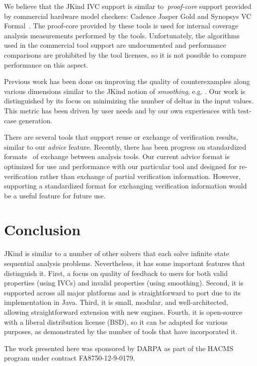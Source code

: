 \documentclass{llncs}
\newcommand{\jkind}{{\sc JKind}\xspace}
\newcommand{\lustre}{{\sc Lustre}\xspace}
\renewcommand{\paragraph}[1]{\vspace{5pt}\noindent {\bf #1}}
\begin{document}
We believe that the \jkind IVC support is similar to~\emph{proof-core}
support provided by commercial hardware model checkers: Cadence Jasper
Gold and Synopsys VC Formal~\cite{hanna2015formal, jasper_gold,
  Synopsys_VC_formal}.  The proof-core provided by these tools is used
for internal coverage analysis measurements performed by the tools.
Unfortunately, the algorithms used in the commercial tool support are
undocumented and performance comparisons are prohibited by the tool
licenses, so it is not possible to compare performance on this aspect.

Previous work has been done on improving the quality of
counterexamples along various dimensions similar to the \jkind notion
of {\em smoothing}, e.g. \cite{groce2005bmc, ravi2004tacas}. Our work
is distinguished by its focus on minimizing the number of deltas in
the input values. This metric has been driven by user needs and by our
own experiences with test-case generation.

There are several tools that support reuse or exchange of verification
results, similar to our {\em advice} feature.  Recently, there has
been progress on standardized formats~\cite{Beyer:2016} of exchange
between analysis tools.  Our current advice format is optimized for
use and performance with our particular tool and designed for
re-verification rather than exchange of partial verification
information.  However, supporting a standardized format for exchanging
verification information would be a useful feature for future use.



\section{Conclusion}
\jkind is similar to a number of other solvers that each solve
infinite state sequential analysis problems. Nevertheless, it has some
important features that distinguish it. First, a focus on quality of
feedback to users for both valid properties (using IVCs) and invalid
properties (using smoothing). Second, it is supported across all major platforms and is
straightforward to port due to its implementation in Java. Third, it
is small, modular, and well-architected, allowing straightforward
extension with new engines. Fourth, it is open-source with a liberal
distribution license (BSD), so it can be adapted for various purposes,
as demonstrated by the number of tools that have incorporated it.



\paragraph{Acknowledgments}

\noindent The work presented here was sponsored by DARPA as part of the HACMS
program under contract FA8750-12-9-0179.

{}

\end{document}
